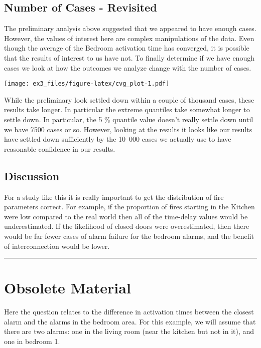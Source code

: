 \documentclass[
]{article}
\begin{document}
\hypertarget{number-of-cases---revisited}{%
\subsection{Number of Cases -
Revisited}\label{number-of-cases---revisited}}

The preliminary analysis above suggested that we appeared to have enough
cases. However, the values of interest here are complex manipulations of
the data. Even though the average of the Bedroom activation time has
converged, it is possible that the results of interest to us have not.
To finally determine if we have enough cases we look at how the outcomes
we analyze change with the number of cases.

\texttt{[image: ex3\_files/figure-latex/cvg\_plot-1.pdf]}

While the preliminary look settled down within a couple of thousand
cases, these results take longer. In particular the extreme quantiles
take somewhat longer to settle down. In particular, the 5 \% quantile
value doesn't really settle down until we have 7500 cases or so.
However, looking at the results it looks like our results have settled
down sufficiently by the 10~000 cases we actually use to have reasonable
confidence in our results.

\hypertarget{discussion}{%
\subsection{Discussion}\label{discussion}}

For a study like this it is really important to get the distribution of
fire parameters correct. For example, if the proportion of fires
starting in the Kitchen were low compared to the real world then all of
the time-delay values would be underestimated. If the likelihood of
closed doors were overestimated, then there would be far fewer cases of
alarm failure for the bedroom alarms, and the benefit of interconnection
would be lower.

\begin{center}\rule{0.5\linewidth}{0.5pt}\end{center}

\hypertarget{obsolete-material}{%
\section{Obsolete Material}\label{obsolete-material}}

Here the question relates to the difference in activation times between
the closest alarm and the alarms in the bedroom area. For this example,
we will assume that there are two alarms: one in the living room (near
the kitchen but not in it), and one in bedroom 1.
\end{document}
